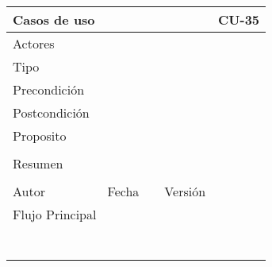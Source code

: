 \documentclass{article}
\begin{document}
\begin{table}[h]
\begin{tabular}{|l|l|l|l|l|l|}
\hline
\multicolumn{2}{|p{2cm}|}{Casos de uso}  & \multicolumn{3}{p{7cm}|}{} & CU-35 \\
\hline
\multicolumn{2}{|p{2cm}|}{Actores}       & \multicolumn{4}{p{8cm}|}{}        \\
\hline
\multicolumn{2}{|p{2cm}|}{Tipo}          & \multicolumn{4}{p{8cm}|}{}        \\
\hline
\multicolumn{2}{|p{2cm}|}{Precondición}  & \multicolumn{4}{p{8cm}|}{}        \\
\hline
\multicolumn{2}{|p{2cm}|}{Postcondición} & \multicolumn{4}{p{8cm}|}{}        \\
\hline
\multicolumn{6}{|p{10cm}|}{Proposito}                                   \\
\hline
\multicolumn{6}{|p{10cm}|}{}                                            \\
\hline
\multicolumn{6}{|p{10cm}|}{Resumen}                                 \\
\hline
\multicolumn{6}{|p{10cm}|}{}                                            \\
\hline
Autor          &              &  Fecha   &     &   Versión  & \\     
\hline
\multicolumn{6}{|p{10cm}|}{Flujo Principal}\\
\hline
\multicolumn{1}{|p{1cm}|}{} & \multicolumn{2}{p{3cm}}{} & \multicolumn{1}{|p{1cm}|}{} & \multicolumn{2}{p{3cm}|}{}\\
\hline
\multicolumn{1}{|p{1cm}|}{} & \multicolumn{2}{p{3cm}}{} & \multicolumn{1}{|p{1cm}|}{} & \multicolumn{2}{p{3cm}|}{}\\
\hline
\multicolumn{1}{|p{1cm}|}{} & \multicolumn{2}{p{3cm}}{} & \multicolumn{1}{|p{1cm}|}{} & \multicolumn{2}{p{3cm}|}{}\\
\hline
\multicolumn{1}{|p{1cm}|}{} & \multicolumn{2}{p{3cm}}{} & \multicolumn{1}{|p{1cm}|}{} & \multicolumn{2}{p{3cm}|}{}\\
\hline
\multicolumn{1}{|p{1cm}|}{} & \multicolumn{2}{p{3cm}}{} & \multicolumn{1}{|p{1cm}|}{} & \multicolumn{2}{p{3cm}|}{}\\
\hline
\multicolumn{1}{|p{1cm}|}{} & \multicolumn{2}{p{3cm}}{} & \multicolumn{1}{|p{1cm}|}{} & \multicolumn{2}{p{3cm}|}{}\\
\hline
\multicolumn{1}{|p{1cm}|}{} & \multicolumn{2}{p{3cm}}{} & \multicolumn{1}{|p{1cm}|}{} & \multicolumn{2}{p{3cm}|}{}\\

\end{tabular}
\end{table}
\end{document}
